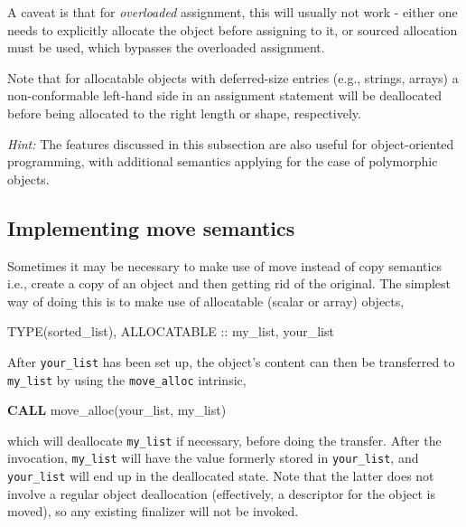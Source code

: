 \documentclass[
  paper=a4,
  ,captions=tableheading
]{scrartcl}
\newenvironment{Shaded}{\begin{snugshade}}{\end{snugshade}}
\newcommand{\DataTypeTok}[1]{\textcolor[rgb]{0.13,0.29,0.53}{#1}}
\newcommand{\KeywordTok}[1]{\textcolor[rgb]{0.13,0.29,0.53}{\textbf{#1}}}
\newcommand{\NormalTok}[1]{#1}
\begin{document}
A caveat is that for \emph{overloaded} assignment, this will usually not
work - either one needs to explicitly allocate the object before
assigning to it, or sourced allocation must be used, which bypasses the
overloaded assignment.

Note that for allocatable objects with deferred-size entries (e.g.,
strings, arrays) a non-conformable left-hand side in an assignment
statement will be deallocated before being allocated to the right length
or shape, respectively.

\emph{Hint:} The features discussed in this subsection are also useful
for object-oriented programming, with additional semantics applying for
the case of polymorphic objects.

\subsection{Implementing move
semantics}\label{implementing-move-semantics}

Sometimes it may be necessary to make use of move instead of copy
semantics i.e., create a copy of an object and then getting rid of the
original. The simplest way of doing this is to make use of allocatable
(scalar or array) objects,

\begin{Shaded}
\begin{Highlighting}[]
\DataTypeTok{TYPE(sorted\_list)}\NormalTok{, }\DataTypeTok{ALLOCATABLE} \DataTypeTok{::}\NormalTok{ my\_list, your\_list}
\end{Highlighting}
\end{Shaded}

After \texttt{your\_list} has been set up, the object's content can then
be transferred to \texttt{my\_list} by using the \texttt{move\_alloc}
intrinsic,

\begin{Shaded}
\begin{Highlighting}[]
\KeywordTok{CALL}\NormalTok{ move\_alloc(your\_list, my\_list)}
\end{Highlighting}
\end{Shaded}

which will deallocate \texttt{my\_list} if necessary, before doing the
transfer. After the invocation, \texttt{my\_list} will have the value
formerly stored in \texttt{your\_list}, and \texttt{your\_list} will end
up in the deallocated state. Note that the latter does not involve a
regular object deallocation (effectively, a descriptor for the object is
moved), so any existing finalizer will not be invoked.
\end{document}
